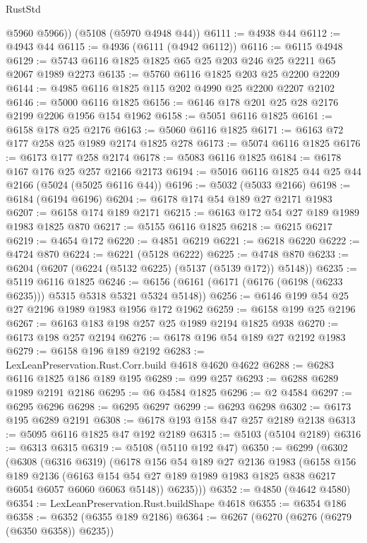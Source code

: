 \begin{lexlean}{RustStd}
\begin{coremodule}
        @5960
        @5966))
    (@5108 (@5970 @4948 @44))
@6111 := @4938 @44
@6112 := @4943 @44
@6115 := @4936 (@6111 (@4942 @6112))
@6116 := @6115 @4948
@6129 := @5743 @6116 @1825 @1825 @65 @25 @203 @246 @25 @2211 @65 @2067 @1989 @2273
@6135 := @5760 @6116 @1825 @203 @25 @2200 @2209
@6144 := @4985 @6116 @1825 @115 @202 @4990 @25 @2200 @2207 @2102
@6146 := @5000 @6116 @1825
@6156 := @6146 @178 @201 @25 @28 @2176 @2199 @2206 @1956 @154 @1962
@6158 := @5051 @6116 @1825
@6161 := @6158 @178 @25 @2176
@6163 := @5060 @6116 @1825
@6171 := @6163 @72 @177 @258 @25 @1989 @2174 @1825 @278
@6173 := @5074 @6116 @1825
@6176 := @6173 @177 @258 @2174
@6178 := @5083 @6116 @1825
@6184 := @6178 @167 @176 @25 @257 @2166 @2173
@6194 := @5016 @6116 @1825 @44 @25 @44 @2166 (@5024 (@5025 @6116 @44))
@6196 := @5032 (@5033 @2166)
@6198 := @6184 (@6194 @6196)
@6204 := @6178 @174 @54 @189 @27 @2171 @1983
@6207 := @6158 @174 @189 @2171
@6215 := @6163 @172 @54 @27 @189 @1989 @1983 @1825 @870
@6217 := @5155 @6116 @1825
@6218 := @6215 @6217
@6219 := @4654 @172
@6220 := @4851 @6219
@6221 := @6218 @6220
@6222 := @4724 @870
@6224 := @6221 (@5128 @6222)
@6225 := @4748 @870
@6233 := @6204 (@6207 (@6224 (@5132 @6225) (@5137 (@5139 @172)) @5148))
@6235 := @5119 @6116 @1825
@6246 := @6156 (@6161 (@6171 (@6176 (@6198 (@6233 @6235))) @5315 @5318 @5321 @5324 @5148))
@6256 := @6146 @199 @54 @25 @27 @2196 @1989 @1983 @1956 @172 @1962
@6259 := @6158 @199 @25 @2196
@6267 := @6163 @183 @198 @257 @25 @1989 @2194 @1825 @938
@6270 := @6173 @198 @257 @2194
@6276 := @6178 @196 @54 @189 @27 @2192 @1983
@6279 := @6158 @196 @189 @2192
@6283 := LexLeanPreservation.Rust.Corr.build @4618 @4620 @4622
@6288 := @6283 @6116 @1825 @186 @189 @195
@6289 := @99 @257
@6293 := @6288 @6289 @1989 @2191 @2186
@6295 := @6 @4584 @1825
@6296 := @2 @4584
@6297 := @6295 @6296
@6298 := @6295 @6297
@6299 := @6293 @6298
@6302 := @6173 @195 @6289 @2191
@6308 := @6178 @193 @158 @47 @257 @2189 @2138
@6313 := @5095 @6116 @1825 @47 @192 @2189
@6315 := @5103 (@5104 @2189)
@6316 := @6313 @6315
@6319 := @5108 (@5110 @192 @47)
@6350 := @6299
    (@6302
      (@6308
        (@6316 @6319)
        (@6178
          @156
          @54
          @189
          @27
          @2136
          @1983
          (@6158
            @156
            @189
            @2136
            (@6163 @154 @54 @27 @189 @1989 @1983 @1825 @838 @6217 @6054 @6057 @6060 @6063 @5148))
          @6235)))
@6352 := @4850 (@4642 @4580)
@6354 := LexLeanPreservation.Rust.buildShape @4618
@6355 := @6354 @186
@6358 := @6352 (@6355 @189 @2186)
@6364 := @6267 (@6270 (@6276 (@6279 (@6350 @6358)) @6235))

\end{coremodule}
\end{lexlean}
